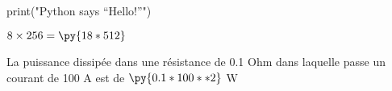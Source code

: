 \documentclass{article}
\newcommand{\pymultiply}[2]{\py{#1*#2}}
\begin{document}
\begin{pycode}
print("Python says ``Hello!''")
\end{pycode}

$8 \times 256 = \pymultiply{18}{512}$

La puissance dissipée dans une résistance de 0.1 Ohm  dans laquelle passe un courant de 100 A est de $\py{0.1*100**2}$
W
\end{document}
